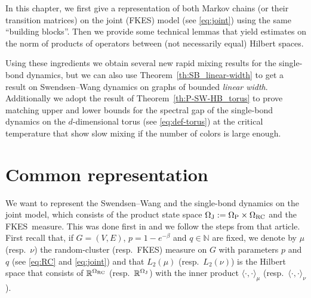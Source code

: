 \documentclass{dis}
\theoremstyle{citing}
\begin{document}
In this chapter, we first give a representation 
of both Markov chains (or their transition matrices) on the joint 
({FKES}) model (see \eqref{eq:joint}) using the same 
``building blocks''. 
Then we provide some technical lemmas that yield estimates on 
the norm of products of operators between (not necessarily equal) 
Hilbert spaces.

Using these ingredients we obtain several new rapid mixing results 
for the single-bond dynamics, but we can also use 
Theorem~\ref{th:SB_linear-width} to get a result on Swendsen--Wang 
dynamics on graphs of bounded \emph{linear width}.
Additionally we adopt the result of Theorem~\ref{th:P-SW-HB_torus} 
to prove matching upper and lower bounds for the spectral gap 
of the single-bond dynamics on the $d$-dimensional torus 
(see \eqref{eq:def-torus}) at the critical temperature that 
show slow mixing if the number of colors is large enough.

\section{Common representation} \label{sec:4_repr}

We want to represent the Swendsen--Wang and the single-bond 
dynamics on the joint model, which consists of the 
product state space ${{\Omega}_{\rm J}}:={{\Omega}_{\rm P}}\times{{\Omega}_{\rm RC}}$ 
and the {FKES}\ measure. 
This was done first in \cite{U3} and we follow the steps from 
that article. 
First recall that, if $G=(V,E)$, $p=1-e^{-\beta}$ and $q\in{\ensuremath{\mathbb{N}}}$ are 
fixed, we denote by $\mu$ (resp.~$\nu$) the random-cluster 
(resp.~{FKES}) measure on $G$ with parameters $p$ and $q$ 
(see \eqref{eq:RC} and \eqref{eq:joint}) 
and that $L_2(\mu)$ (resp.~$L_2(\nu)$) is the Hilbert space that 
consists of ${\ensuremath{\mathbb{R}}}^{{\Omega}_{\rm RC}}$ (resp.~${\ensuremath{\mathbb{R}}}^{{\Omega}_{\rm J}}$) with the inner product 
${\langle}\cdot,\cdot{\rangle}_\mu$ (resp.~${\langle}\cdot,\cdot{\rangle}_\nu$).
\end{document}
